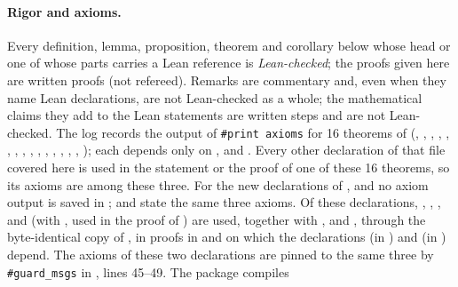 \paragraph{Rigor and axioms.} Every definition, lemma, proposition, theorem and corollary below whose head or one
of whose parts carries a Lean reference is \emph{Lean-checked}; the proofs given here are written proofs (not
refereed). Remarks are commentary and, even when they name Lean declarations, are not Lean-checked as a whole; the
mathematical claims they add to the Lean statements are written steps and are not Lean-checked. The log
 records the output of \texttt{\#print axioms} for 16 theorems of
 (, ,
, , , ,
, , ,
, , ,
, , , ); each depends
only on ,  and . Every other declaration of that file
covered here is used in the statement or the proof of one of these 16 theorems, so its axioms are among these
three. For the new
declarations of ,  and  no axiom output is saved in
;  and  state the same three
axioms. Of these declarations, , , ,
 and  (with , used in the
proof of ) are used, together with ,
 and , through the
byte-identical copy of , in proofs in  and
 on which the declarations 
(in ) and  (in
) depend. The axioms of these two declarations are pinned to the
same three by \texttt{\#guard\_msgs} in , lines 45--49. The package compiles
